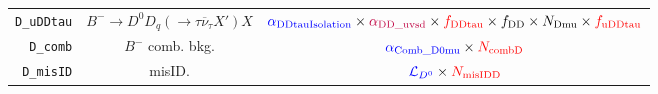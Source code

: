 \begin{landscape}
\begin{table}
\begin{tabular}{r|c|c}
       \texttt{D\_uDDtau} &        $B^- \rightarrow D^0 D_q (\rightarrow \tau \overline{\nu}_\tau X') X$         &                                                                            $\textcolor{blue}{\alpha_\text{DDtauIsolation}} \times \textcolor{purple}{\alpha_\text{DD\_uvsd}} \times \textcolor{red}{f_\text{DDtau}} \times f_\text{DD} \times N_\text{Dmu} \times \textcolor{red}{f_\text{uDDtau}}$                                                                            \\
         \texttt{D\_comb} &                                   $B^-$ comb. bkg.                                   &                                                                                                                                              $\textcolor{blue}{\alpha_\text{Comb\_D0mu}} \times \textcolor{red}{N_\text{combD}}$                                                                                                                                               \\
        \texttt{D\_misID} &                                        misID.                                        &                                                                                                                                                 $\textcolor{blue}{\mathcal{L}_{D^0}} \times \textcolor{red}{N_\text{misIDD}}$                                                                                                                                                  \\
\bottomrule
\end{tabular}

\end{table}
\end{landscape}
\restoregeometry
